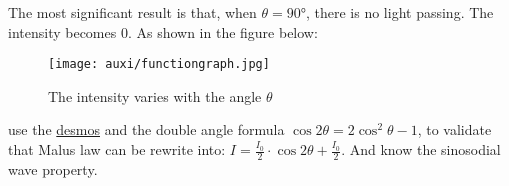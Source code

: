 \documentclass[a4paper]{tufte-handout}
\newenvironment{ExampleBox} %
{\begin{tcolorbox}[breakable,colback=g1!30,colframe=g1,title=Example]} {\end{tcolorbox}}
\begin{document}
The most significant result is that, when $\theta=\ang{90}$, there is no light passing. The intensity becomes 0. As shown in the figure below:
\begin{figure}[h]
\centering
\texttt{[image: auxi/functiongraph.jpg]}
\caption{The intensity varies with the angle $\theta$}
\end{figure}

\begin{ExampleBox}
use the \href{https://www.desmos.com/calculator}{desmos} and the double angle formula $\cos 2\theta = 2\cos^2\theta -1$, to validate that Malus law can be rewrite into: $I = \frac{I_0}{2}\cdot \cos2\theta + \frac{I_0}{2}$. And know the sinosodial wave property.
\tcblower
\vspace{1in}
\end{ExampleBox}
\end{document}
